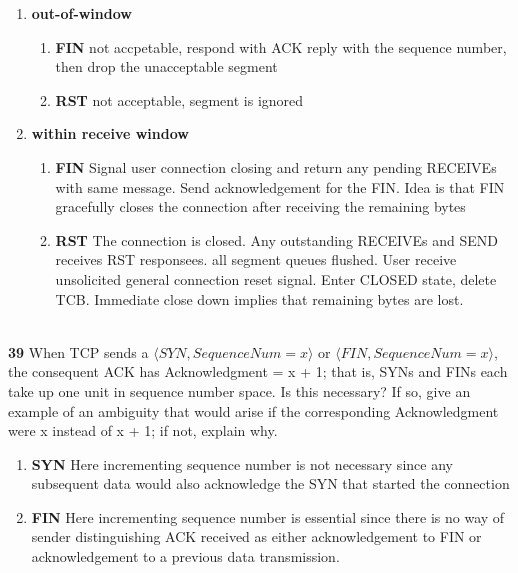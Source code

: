 \documentclass[11pt]{article}
\begin{document}
\begin{solution}
    \begin{enumerate}
        \item \textbf{out-of-window} \\
        \begin{enumerate}
            \item \textbf{FIN} not accpetable, respond with ACK reply with the sequence number, then drop the unacceptable segment
            \item \textbf{RST} not acceptable, segment is ignored
        \end{enumerate}
        \item \textbf{within receive window} \\
        \begin{enumerate}
            \item \textbf{FIN} Signal user connection closing and return any pending RECEIVEs with same message. Send acknowledgement for the FIN. Idea is that FIN gracefully closes the connection after receiving the remaining bytes
            \item \textbf{RST} The connection is closed. Any outstanding RECEIVEs and SEND receives RST responsees. all segment queues flushed. User receive unsolicited general connection reset signal. Enter CLOSED state, delete TCB. Immediate close down implies that remaining bytes are lost.
        \end{enumerate}
    \end{enumerate}
\end{solution}

$ $\\
\textbf{39} When TCP sends a $\langle SYN,SequenceNum=x \rangle$ or $\langle FIN, SequenceNum = x\rangle$, the consequent ACK has
Acknowledgment = x + 1; that is, SYNs and FINs each take up one unit in sequence number space. Is this necessary? If so, give an example of an ambiguity that would arise if the corresponding Acknowledgment were x instead of x + 1; if not, explain why.


\begin{solution}
    \begin{enumerate}
        \item \textbf{SYN} Here incrementing sequence number is not necessary since any subsequent data would also acknowledge the SYN that started the connection
        \item \textbf{FIN} Here incrementing sequence number is essential since there is no way of sender distinguishing ACK received as either acknowledgement to FIN or acknowledgement to a previous data transmission. 
    \end{enumerate}
\end{solution}
\end{document}
